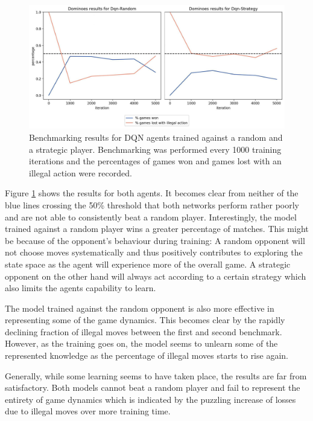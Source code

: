 \documentclass[12pt,a4paper]{article}
\begin{document}
\begin{figure}
  \includegraphics[width=\linewidth]{img/dqn_both.jpg}
  \centering 
  \caption{Benchmarking results for DQN agents trained against a random and a strategic player. Benchmarking was performed every 1000 training iterations and the percentages of games won and games lost with an illegal action were recorded.}
  \label{fig:dqn_both}
\end{figure}

Figure \ref{fig:dqn_both} shows the results for both agents. It becomes clear from neither of the blue lines crossing the 50\% threshold that both networks perform rather poorly and are not able to consistently beat a random player.
Interestingly, the model trained against a random player wins a greater percentage of matches. This might be because of the opponent’s behaviour during training: A random opponent will not choose moves systematically and thus positively contributes to exploring the state space as the agent will experience more of the overall game. A strategic opponent on the other hand will always act according to a certain strategy which also limits the agents capability to learn.

The model trained against the random opponent is also more effective in representing some of the game dynamics. This becomes clear by the rapidly declining fraction of illegal moves between the first and second benchmark. However, as the training goes on, the model seems to unlearn some of the represented knowledge as the percentage of illegal moves starts to rise again.

Generally, while some learning seems to have taken place, the results are far from satisfactory. Both models cannot beat a random player and fail to represent the entirety of game dynamics which is indicated by the puzzling increase of losses due to illegal moves over more training time.
\end{document}
